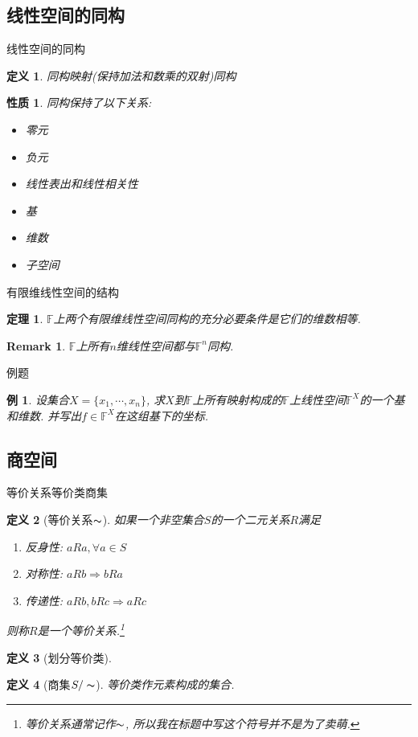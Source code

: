 \documentclass[11pt]{beamer}
\newtheorem{defi}{定义}[section]
\newtheorem{prop}{性质}[section]
\newtheorem{thrm}{定理}[section]
\newtheorem{exmp}{例}[section]
\newtheorem{rmk}{Remark}[section]
\begin{document}
\subsection{线性空间的同构}
\frame{\subsectionpage}

\begin{frame}{线性空间的同构}
\begin{defi}
	同构映射(保持加法和数乘的双射)\quad 同构
\end{defi}
\begin{prop}
	同构保持了以下关系:
	\begin{itemize}
		\item 零元
		\item 负元
		\item 线性表出和线性相关性
		\item 基
		\item 维数
		\item 子空间
	\end{itemize}
\end{prop}
\end{frame}

\begin{frame}{有限维线性空间的结构}
\begin{thrm}
	$\mathbb{F}$上两个有限维线性空间同构的充分必要条件是它们的维数相等.
\end{thrm}
\begin{rmk}
	$\mathbb{F}$上所有$n$维线性空间都与$\mathbb{F}^n$同构.
\end{rmk}
\end{frame}

\begin{frame}{例题}
	\begin{exmp}
		设集合$X=\{x_1,\cdots, x_n\}$, 求$X$到$\mathbb{F}$上所有映射构成的$\mathbb{F}$上线性空间$\mathbb{F}^X$的一个基和维数. 并写出$f\in\mathbb{F}^X$在这组基下的坐标.
	\end{exmp}
\end{frame}

\subsection{商空间}
\frame{\subsectionpage}

\begin{frame}{等价关系\quad 等价类\quad 商集}
	\begin{defi}[等价关系$\thicksim$]
		如果一个非空集合$S$的一个二元关系$R$满足
		\begin{enumerate}
			\item 反身性: $aRa, \forall a\in S$
			\item 对称性: $aRb\Rightarrow bRa$
			\item 传递性: $aRb, bRc\Rightarrow aRc$
		\end{enumerate}
		则称$R$是一个等价关系.\footnote{等价关系通常记作$\thicksim$, 所以我在标题中写这个符号并不是为了卖萌.}
	\end{defi}
	\begin{defi}[划分\quad 等价类]
	\end{defi}
	\begin{defi}[商集$S/\thicksim$]
		等价类作元素构成的集合.
	\end{defi}
\end{frame}
\end{document}
